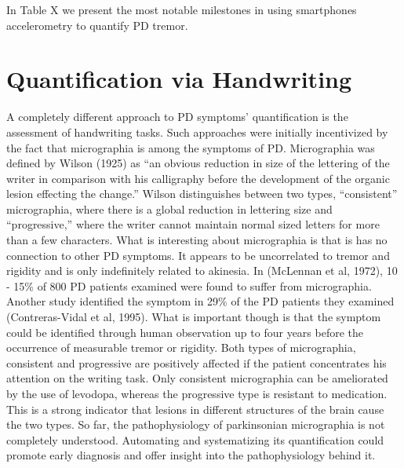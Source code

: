 In \textcolor{BurntOrange}{Table X} we present the most notable milestones in using smartphones accelerometry to quantify \gls{PD} tremor. 


\section{Quantification via Handwriting}
\label{sec:handwriting}
A completely different approach to \gls{PD} symptoms' quantification is the assessment of handwriting tasks. Such approaches were initially incentivized by the fact that micrographia is among the symptoms of PD. Micrographia was defined by Wilson (1925) as ``an obvious reduction in size of the lettering of the writer in comparison with his calligraphy before the development of the organic lesion effecting the change.'' Wilson distinguishes between two types, ``consistent'' micrographia, where there is a global reduction in lettering size and ``progressive,'' where the writer cannot maintain normal sized letters for more than a few characters. What is interesting about micrographia is that is has no connection to other \gls{PD} symptoms. It appears to be uncorrelated to tremor and rigidity and is only indefinitely related to akinesia. In (McLennan et al, 1972), 10 - 15\% of 800 \gls{PD} patients examined were found to suffer from micrographia. Another study identified the symptom in 29\% of the \gls{PD} patients they examined (Contreras-Vidal et al, 1995). What is important though is that the symptom could be identified through human observation up to four years before the occurrence of measurable tremor or rigidity. 
Both types of micrographia, consistent and progressive are positively affected if the patient concentrates his attention on the writing task. Only consistent micrographia can be ameliorated by the use of levodopa, whereas the progressive type is resistant to medication. This is a strong indicator that lesions in different structures of the brain cause the two types. So far, the pathophysiology of parkinsonian micrographia is not completely understood. Automating and systematizing its quantification could promote early diagnosis and offer insight into the pathophysiology behind it.

